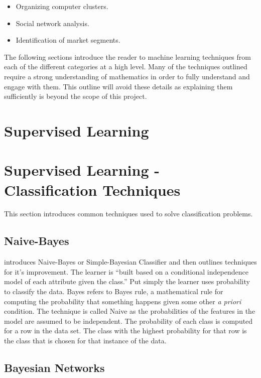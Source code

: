 \begin{itemize}
  \item Organizing computer clusters.
  \item Social network analysis.
  \item Identification of market segments.
\end{itemize}

The following sections introduce the reader to machine learning techniques from each of the different categories at a high level. Many of the techniques outlined require a strong understanding of mathematics in order to fully understand and engage with them. This outline will avoid these details as explaining them sufficiently is beyond the scope of this project.

\section{Supervised Learning}


\section{Supervised Learning - Classification Techniques}

This section introduces common techniques used to solve classification problems.
\subsection{Naive-Bayes}
\cite{kohavi1997improving} introduces Naive-Bayes or Simple-Bayesian Classifier and then outlines techniques for it's improvement. The learner is ``built based on a conditional independence model of each attribute given the class.'' Put simply the learner uses probability to classify the data. Bayes refers to Bayes rule, a mathematical rule for computing the probability that something happens given some other \textit{a priori} condition. The technique is called Naive as the probabilities of the features in the model are assumed to be independent. The probability of each class is computed for a row in the data set. The class with the highest probability for that row is the class that is chosen for that instance of the data.


\subsection{Bayesian Networks}

